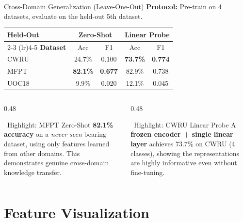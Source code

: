 \documentclass[aspectratio=169, 11pt]{beamer}
\begin{document}
\begin{frame}{Cross-Domain Generalization (Leave-One-Out)}
\textbf{Protocol:} Pre-train on 4 datasets, evaluate on the held-out 5th dataset.

\vspace{0.3cm}
\begin{table}
\centering
\begin{tabular}{@{}l cc cc@{}}
\toprule
\textbf{Held-Out} & \multicolumn{2}{c}{\textbf{Zero-Shot}} & \multicolumn{2}{c}{\textbf{Linear Probe}} \\
\cmidrule(lr){2-3} \cmidrule(lr){4-5}
\textbf{Dataset} & Acc & F1 & Acc & F1 \\
\midrule
CWRU  & 24.7\% & 0.100 & \textbf{73.7\%} & \textbf{0.774} \\
MFPT  & \textbf{82.1\%} & \textbf{0.677} & 82.9\% & 0.738 \\
UOC18 & 9.9\%  & 0.020 & 12.1\% & 0.045 \\
\bottomrule
\end{tabular}
\end{table}

\vspace{0.3cm}
\begin{columns}[T]
\begin{column}{0.48\textwidth}
\begin{block}{\textcolor{good}{\faCheckCircle}\ Highlight: MFPT Zero-Shot}
\textbf{82.1\% accuracy} on a \emph{never-seen} bearing dataset, using only features learned from other domains. This demonstrates genuine cross-domain knowledge transfer.
\end{block}
\end{column}
\begin{column}{0.48\textwidth}
\begin{block}{\textcolor{good}{\faCheckCircle}\ Highlight: CWRU Linear Probe}
A \textbf{frozen encoder + single linear layer} achieves 73.7\% on CWRU (4 classes), showing the representations are highly informative even without fine-tuning.
\end{block}
\end{column}
\end{columns}
\end{frame}

\section{Feature Visualization}
\end{document}
